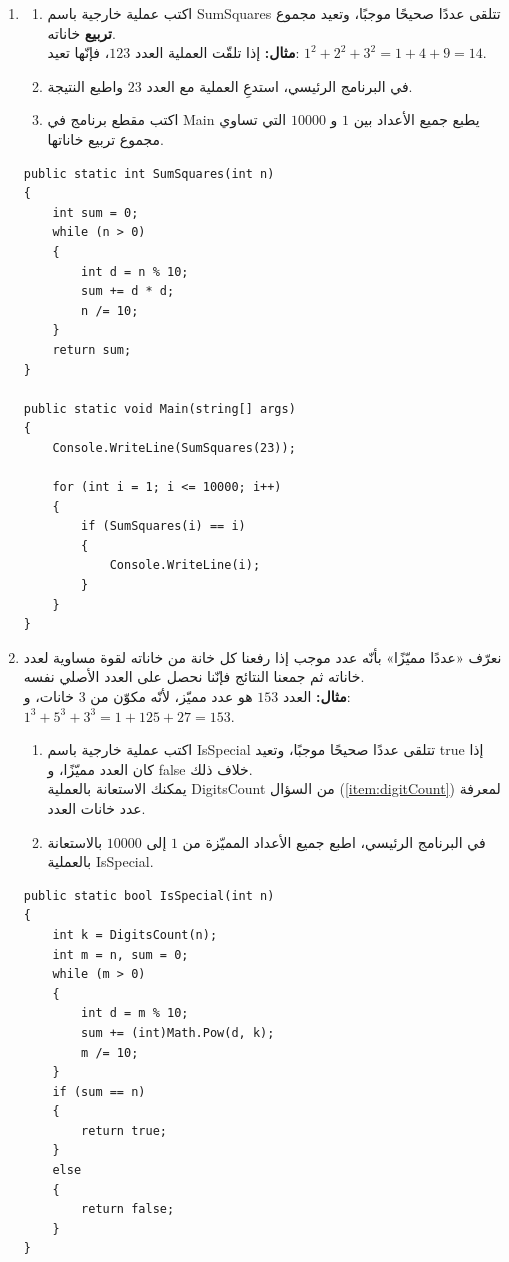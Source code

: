 \documentclass[14pt]{extarticle}
\begin{document}
\begin{enumerate}[itemsep=2em]
\item
\begin{enumerate}
    \item اكتب عملية خارجية باسم \textenglish{SumSquares} تتلقى عددًا صحيحًا موجبًا، وتعيد مجموع \textbf{تربيع} خاناته. \\
    \textbf{مثال:} إذا تلقّت العملية العدد $123$، فإنّها تعيد: $1^2 + 2^2 + 3^2 = 1 + 4 + 9 = 14$.
    \item في البرنامج الرئيسي، استدعِ العملية مع العدد $23$ واطبع النتيجة.
    \item اكتب مقطع برنامج في \textenglish{Main} يطبع جميع الأعداد بين $1$ و $10000$ التي تساوي مجموع تربيع خاناتها.
\end{enumerate}
\ifwithsols
\begin{boxSolution}
\begin{english}
\begin{verbatim}
public static int SumSquares(int n)
{
    int sum = 0;
    while (n > 0)
    {
        int d = n % 10;
        sum += d * d;
        n /= 10;
    }
    return sum;
}

public static void Main(string[] args)
{
    Console.WriteLine(SumSquares(23));

    for (int i = 1; i <= 10000; i++)
    {
        if (SumSquares(i) == i)
        {
            Console.WriteLine(i);
        }
    }
}
\end{verbatim}
\end{english}
\end{boxSolution}
\fi
\filbreak

\item نعرّف «عددًا مميّزًا» بأنّه عدد موجب إذا رفعنا كل خانة من خاناته لقوة مساوية لعدد خاناته ثم جمعنا النتائج فإنّنا نحصل على العدد الأصلي نفسه. \\
\textbf{مثال:} العدد $153$ هو عدد مميّز، لأنّه مكوّن من $3$ خانات، و:
$1^3 + 5^3 + 3^3 = 1 + 125 + 27 = 153$.
\begin{enumerate}
    \item اكتب عملية خارجية باسم \textenglish{IsSpecial} تتلقى عددًا صحيحًا موجبًا، وتعيد \textenglish{true} إذا كان العدد مميّزًا، و \textenglish{false} خلاف ذلك. \\
    يمكنك الاستعانة بالعملية \textenglish{DigitsCount} من السؤال (\ref{item:digitCount}) لمعرفة عدد خانات العدد.
    \item في البرنامج الرئيسي، اطبع جميع الأعداد المميّزة من $1$ إلى $10000$ بالاستعانة بالعملية \textenglish{IsSpecial}.
\end{enumerate}
\ifwithsols
\begin{boxSolution}
\begin{english}
\begin{verbatim}
public static bool IsSpecial(int n)
{
    int k = DigitsCount(n);
    int m = n, sum = 0;
    while (m > 0)
    {
        int d = m % 10;
        sum += (int)Math.Pow(d, k);
        m /= 10;
    }
    if (sum == n)
    {
        return true;
    }
    else
    {
        return false;
    }
}


\end{verbatim}
\end{english}
\end{boxSolution}
\end{enumerate}
\end{document}
